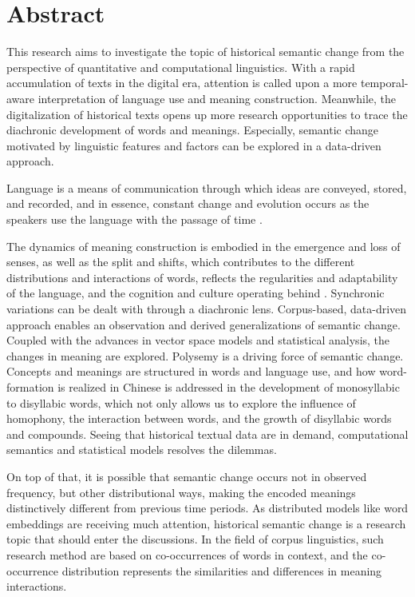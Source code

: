 

\chapter*{Abstract}

This research aims to investigate the topic of historical semantic change from the perspective of quantitative and computational linguistics. With a rapid accumulation of texts in the digital era, attention is called upon a more temporal-aware interpretation of language use and meaning construction. Meanwhile, the digitalization of historical texts opens up more research opportunities to trace the diachronic development of words and meanings. Especially, semantic change motivated by linguistic features and factors can be explored in a data-driven approach. 

Language is a means of communication through which ideas are conveyed, stored, and recorded, and in essence, constant change and evolution occurs as the speakers use the language with the passage of time \parencite[61]{blank1999new}. 

The dynamics of meaning construction is embodied in the emergence and loss of senses, as well as the split and shifts, which contributes to the different distributions and interactions of words, reflects the regularities and adaptability of the language, and the cognition and culture operating behind \parencite[63]{blank1999new}. Synchronic variations can be dealt with through a diachronic lens. Corpus-based, data-driven approach enables an observation and derived generalizations of semantic change. Coupled with the advances in vector space models and statistical analysis, the changes in meaning are explored. Polysemy is a driving force of semantic change. Concepts and meanings are structured in words and language use, and how word-formation is realized in Chinese is addressed in the development of monosyllabic to disyllabic words, which not only allows us to explore the influence of homophony, the interaction between words, and the growth of disyllabic words and compounds. Seeing that historical textual data are in demand, computational semantics and statistical models resolves the dilemmas. 

On top of that, it is possible that semantic change occurs not in observed frequency, but other distributional ways, making the encoded meanings distinctively different from previous time periods. As distributed models like word embeddings are receiving much attention, historical semantic change is a research topic that should enter the discussions. In the field of corpus linguistics, such research method are based on co-occurrences of words in context, and the co-occurrence distribution represents the similarities and differences in meaning interactions. 

